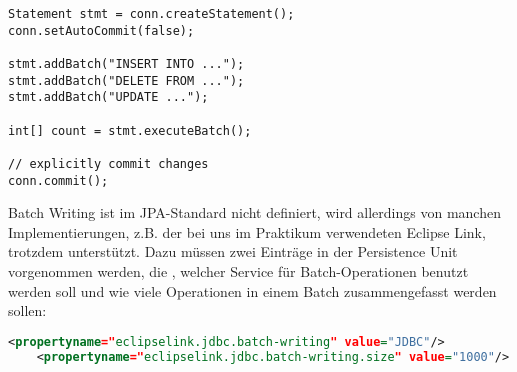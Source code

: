 \begin{lstlisting}
Statement stmt = conn.createStatement();
conn.setAutoCommit(false);

stmt.addBatch("INSERT INTO ...");
stmt.addBatch("DELETE FROM ...");
stmt.addBatch("UPDATE ...");

int[] count = stmt.executeBatch();

// explicitly commit changes
conn.commit();
\end{lstlisting}

Batch Writing ist im JPA-Standard nicht definiert, wird allerdings von manchen Implementierungen, z.B. der bei uns im Praktikum verwendeten Eclipse Link, trotzdem unterstützt. Dazu müssen zwei Einträge in der Persistence Unit vorgenommen werden, die , welcher Service für Batch-Operationen benutzt werden soll und wie viele Operationen in einem Batch zusammengefasst werden sollen:
\begin{lstlisting}[language=XML]
    <propertyname="eclipselink.jdbc.batch-writing" value="JDBC"/>
    <propertyname="eclipselink.jdbc.batch-writing.size" value="1000"/>
\end{lstlisting}